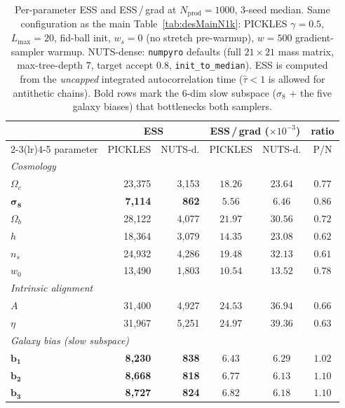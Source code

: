\documentclass{article}
\begin{document}
\begin{table}[t]
\centering
\caption{Per-parameter ESS and ESS\,/\,grad at $N_{\text{prod}} = 1000$,
$3$-seed median.  Same configuration as the main
Table~\ref{tab:desMainN1k}: PICKLES $\gamma = 0.5$, $L_{\max} = 20$,
fid-ball init, $w_s = 0$ (no stretch pre-warmup), $w = 500$
gradient-sampler warmup.  NUTS-dense: \texttt{numpyro} defaults (full
$21\!\times\!21$ mass matrix, max-tree-depth $7$, target accept $0.8$,
\texttt{init\_to\_median}).  ESS is computed from the \emph{uncapped}
integrated autocorrelation time ($\hat\tau < 1$ is allowed for
antithetic chains).  Bold rows mark the $6$-dim slow subspace
($\sigma_8$ + the five galaxy biases) that bottlenecks both samplers.}
\label{tab:desPerDimEss}
\small
\begin{tabular}{l rr cc c}
\toprule
& \multicolumn{2}{c}{ESS}
& \multicolumn{2}{c}{ESS\,/\,grad ($\times 10^{-3}$)} & ratio \\
\cmidrule(lr){2-3}\cmidrule(lr){4-5}
parameter & PICKLES & NUTS-d. & PICKLES & NUTS-d. & P/N \\
\midrule
\multicolumn{6}{l}{\emph{Cosmology}} \\
$\Omega_c$ & 23{,}375 & 3{,}153 & $18.26$ & $23.64$ & $0.77$ \\
$\boldsymbol{\sigma_8}$ & \textbf{7{,}114} & \textbf{862} & $\mathbf{5.56}$ & $\mathbf{6.46}$ & $0.86$ \\
$\Omega_b$ & 28{,}122 & 4{,}077 & $21.97$ & $30.56$ & $0.72$ \\
$h$        & 18{,}364 & 3{,}079 & $14.35$ & $23.08$ & $0.62$ \\
$n_s$      & 24{,}932 & 4{,}286 & $19.48$ & $32.13$ & $0.61$ \\
$w_0$      & 13{,}490 & 1{,}803 & $10.54$ & $13.52$ & $0.78$ \\
\midrule
\multicolumn{6}{l}{\emph{Intrinsic alignment}} \\
$A$    & 31{,}400 & 4{,}927 & $24.53$ & $36.94$ & $0.66$ \\
$\eta$ & 31{,}967 & 5{,}251 & $24.97$ & $39.36$ & $0.63$ \\
\midrule
\multicolumn{6}{l}{\emph{Galaxy bias (slow subspace)}} \\
$\boldsymbol{b_1}$ & \textbf{8{,}230} & \textbf{838} & $\mathbf{6.43}$ & $\mathbf{6.29}$ & $1.02$ \\
$\boldsymbol{b_2}$ & \textbf{8{,}668} & \textbf{818} & $\mathbf{6.77}$ & $\mathbf{6.13}$ & $1.10$ \\
$\boldsymbol{b_3}$ & \textbf{8{,}727} & \textbf{824} & $\mathbf{6.82}$ & $\mathbf{6.18}$ & $1.10$ \\

\end{tabular}
\end{table}
\end{document}
